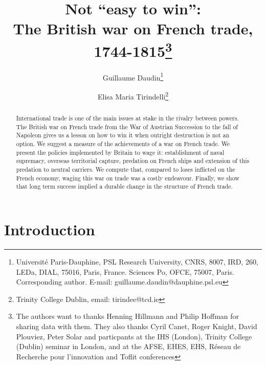 \documentclass[12pt,a4paper,notitlepage,english]{article}
\author{
  Guillaume Daudin\thanks{Université Paris-Dauphine, PSL Research University, CNRS, 8007, IRD, 260, LEDa, DIAL, 75016, Paris, France. Sciences Po, OFCE, 75007, Paris. Corresponding author. E-mail: guillaume.daudin@dauphine.psl.eu}
  \and
  Elisa Maria Tirindelli\thanks{Trinity College Dublin, email: tirindee@tcd.ie}
}
\title{Not “easy to win”: \\ The British war on French trade, 1744-1815\thanks{The authors want to thanks Henning Hillmann and Philip Hoffman for sharing data with them. They also thanks Cyril Canet, Roger Knight, David Plouviez, Peter Solar and particpants at the IHS (London), Trinity College (Dublin) seminar in London, and at the AFSE, EHES, EHS, Réseau de Recherche pour l’innovation and Toflit conferences}}
\date{}
\begin{document}
\maketitle


\begin{abstract}
International trade is one of the main issues at stake in the rivalry between powers. The
British war on French trade from the War of Austrian Succession to the fall of Napoleon gives
us a lesson on how to win it when outright destruction is not an option. We suggest a measure
of the achievements of a war on French trade. We present the policies implemented by Britain
to wage it: establishment of naval supremacy, overseas territorial capture, predation on French
ships and extension of this predation to neutral carriers.
We compute that, compared to loses inflicted on the French economy, waging this war on trade was a costly endeavour.
Finally, we show that long term success implied a durable change in the structure of French trade.
\end{abstract}




\section{Introduction} \label{introduction}


\maketitle
\end{document}

